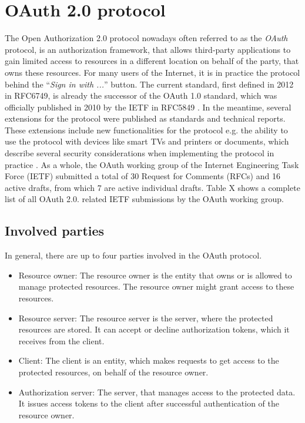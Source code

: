 \documentclass[
    fontsize=12pt,
    headings=small,
    parskip=half,           %
    bibliography=totoc,
    numbers=noenddot,       %
    open=any,               %
    ]{scrreprt}
\begin{document}
\section{OAuth 2.0 protocol}
The Open Authorization 2.0 protocol nowadays often referred to as the
\emph{OAuth} protocol, is an authorization framework, that allows third-party
applications to gain limited access to resources in a different location on
behalf of the party, that owns these resources. For many users of the Internet,
it is in practice the protocol behind the ``\emph{Sign in with ...}'' button.
The current standard, first defined in 2012 in RFC6749, is already the
successor of the OAuth 1.0 standard, which was officially published in 2010 by
the IETF in RFC5849 \cite{hammer2010rfc}. In the meantime, several extensions
for the protocol were published as standards and technical reports. These
extensions include new functionalities for the protocol e.g. the ability to use
the protocol with devices like smart TVs and printers \cite{denniss2019oauth}
or documents, which describe several security considerations when implementing
the protocol in practice \cite{lodderstedt2020oauth}. As a whole, the OAuth
working group of the Internet Engineering Task Force (IETF) submitted a total
of 30 Request for Comments (RFCs) and 16 active drafts, from which 7 are active
individual drafts. Table X shows a complete list of all OAuth 2.0. related IETF
submissions by the OAuth working group. 

\subsection{Involved parties}
In general, there are up to four parties involved in the OAuth protocol.

\begin{itemize} 

    \item Resource owner: The resource owner is the entity that owns or is
        allowed to manage protected resources. The resource owner might grant
        access to these resources. 

    \item Resource server: The resource server is the server, where the
        protected resources are stored. It can accept or decline authorization
        tokens, which it receives from the client. 

    \item Client: The client is an entity, which makes requests to get access
        to the protected resources, on behalf of the resource owner. 
        
    \item Authorization server: The server, that manages access to the
        protected data. It issues access tokens to the client after successful
        authentication of the resource owner. 

\end{itemize}
\end{document}
